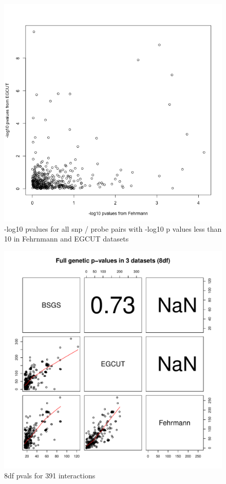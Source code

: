 \documentclass[paper=a4, fontsize=11pt]{scrartcl}	%
\numberwithin{equation}{section}									%
\numberwithin{figure}{section}										%
\numberwithin{table}{section}										%
\begin{document}
\begin{figure}[p]
	\centering
	\includegraphics[width=15cm]{images/EGCUT_vs_Fehrmann_pval10}
	\caption{-log10 pvalues for all snp / probe pairs with -log10 p values less than 10 in Fehrnmann and EGCUT datasets}
	\label{fig:repl_match10}
\end{figure}


\begin{figure}[p]
	\centering
	\includegraphics[width=15cm]{images/pfull_rep_pvals}
	\caption{8df pvals for 391 interactions}
	\label{fig:cor_8df}
\end{figure}
\end{document}
